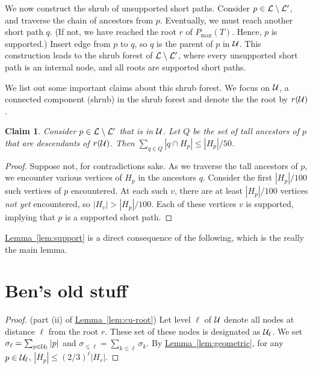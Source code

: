 \documentclass[11pt]{article}
\newtheorem{lemma}[theorem]{Lemma}
\newtheorem{claim}[theorem]{Claim}
\theoremstyle{definition}
\newcommand{\cL}{{\cal L}}
\newcommand{\cU}{{\cal U}}
\newcommand{\Lem}[1]{\hyperref[lem:#1]{Lemma~\ref*{lem:#1}}} %
\newcommand{\pmax}{P_{\max}}
\begin{document}
{We now construct the shrub of unsupported short paths. Consider $p \in \cL \setminus \cL'$,
and traverse the chain of ancestors from $p$. Eventually, we must reach another short path $q$.
(If not, we have reached the root $r$ of $\pmax(T)$. Hence, $p$ is supported.)
Insert edge from $p$ to $q$, so $q$ is the parent of $p$ in $\cU$. This construction leads
to the shrub forest of $\cL \setminus \cL'$, where every unsupported short path is an internal node, and all
roots are supported short paths. 

We list out some important claims about this shrub forest.
We focus on $\cU$, a connected component (shrub) in the shrub forest and denote the 
the root by $r(\cU)$.

\begin{claim} \label{clm:loss2} Consider $p \in \cL \setminus \cL'$ that is in $\cU$. Let $Q$
be the set of tall ancestors of $p$ that are descendants of $r(\cU)$. Then $\sum_{q \in Q} |q \cap H_p| \leq |H_p|/50$.
\end{claim}

\begin{proof} Suppose not, for contradictions sake. As we traverse the tall ancestors of $p$,
we encounter various vertices of $H_p$ in the ancestors $q$. Consider the first $|H_p|/100$
such vertices of $p$ encountered. At each such $v$, there are at least $|H_p|/100$
vertices \emph{not yet} encountered, so $|H_v| > |H_p|/100$. Each of these vertices $v$
is supported, implying that $p$ is a supported short path.
\end{proof}

\Lem{support} is a direct consequence of the following,
which is the really the main lemma.

%

\section{Ben's old stuff}



\begin{proof} (part (ii) of \Lem{cu-root}) Let level $\ell$ of $\cU$ denote all nodes at distance $\ell$ from the root $r$.
These set of these nodes is designated as $\cU_\ell$. We set $\sigma_\ell = \sum_{p \in \cU_\ell} |p|$
and $\sigma_{\leq \ell} = \sum_{k \leq \ell} \sigma_k$.
By \Lem{geometric}, for any $p \in \cU_\ell$, $|H_p| \leq (2/3)^\ell |H_r|$.


\end{proof}}
\end{document}
